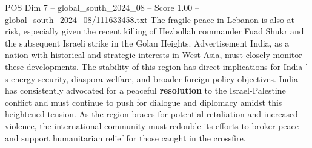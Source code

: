 \begin{textsample}{POS Dim 7 – global\_south\_2024\_08 – Score 1.00 – global\_south\_2024\_08/111633458.txt}
The fragile peace in Lebanon is also at risk, especially given the recent killing of Hezbollah commander Fuad Shukr and the subsequent Israeli strike in the Golan Heights.
Advertisement India, as a nation with historical and strategic interests in West Asia, must closely monitor these developments.
The stability of this region has direct implications for India ' s energy security, diaspora welfare, and broader foreign policy objectives.
India has consistently advocated for a peaceful \textbf{resolution} to the Israel-Palestine conflict and must continue to push for dialogue and diplomacy amidst this heightened tension.
As the region braces for potential retaliation and increased violence, the international community must redouble its efforts to broker peace and support humanitarian relief for those caught in the crossfire.

\end{textsample}
